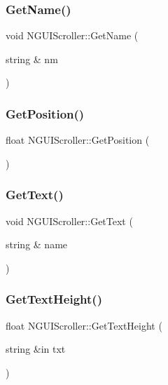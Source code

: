 \subsubsection{\texorpdfstring{Get\+Name()}{GetName()}}
{\footnotesize\ttfamily void N\+G\+U\+I\+Scroller\+::\+Get\+Name (\begin{DoxyParamCaption}\item[{string \&}]{nm }\end{DoxyParamCaption})}

\hypertarget{class_n_g_u_i_scroller_a951bca1ceed1c01a5d0d4418329f7793}{}\label{class_n_g_u_i_scroller_a951bca1ceed1c01a5d0d4418329f7793} 
\subsubsection{\texorpdfstring{Get\+Position()}{GetPosition()}}
{\footnotesize\ttfamily float N\+G\+U\+I\+Scroller\+::\+Get\+Position (\begin{DoxyParamCaption}{ }\end{DoxyParamCaption})}

\hypertarget{class_n_g_u_i_scroller_aa38ada8b6e3268ad1d5205569ad44504}{}\label{class_n_g_u_i_scroller_aa38ada8b6e3268ad1d5205569ad44504} 
\subsubsection{\texorpdfstring{Get\+Text()}{GetText()}}
{\footnotesize\ttfamily void N\+G\+U\+I\+Scroller\+::\+Get\+Text (\begin{DoxyParamCaption}\item[{string \&}]{name }\end{DoxyParamCaption})}

\hypertarget{class_n_g_u_i_scroller_a0e9d9d11e167f61a981c82da48a1da05}{}\label{class_n_g_u_i_scroller_a0e9d9d11e167f61a981c82da48a1da05} 
\subsubsection{\texorpdfstring{Get\+Text\+Height()}{GetTextHeight()}}
{\footnotesize\ttfamily float N\+G\+U\+I\+Scroller\+::\+Get\+Text\+Height (\begin{DoxyParamCaption}\item[{string \&in}]{txt }\end{DoxyParamCaption})}


